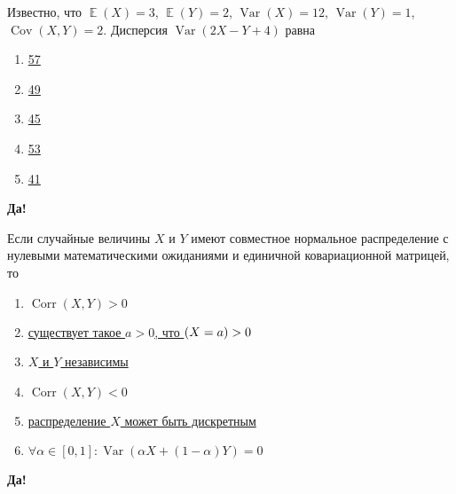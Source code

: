 \documentclass[t]{beamer}
\DeclareMathOperator{\Var}{Var}
\DeclareMathOperator{\Cov}{Cov}
\DeclareMathOperator{\Corr}{Corr}
\DeclareMathOperator{\E}{\mathbb{E}}
\let\P\relax
\DeclareMathOperator{\P}{\mathbb{P}}
\begin{document}
 \begin{frame} \label{13-Yes} 
\begin{block}{13} 

  Известно, что $\E(X)=3$, $\E(Y)=2$, $\Var(X)=12$, $\Var(Y)=1$, $\Cov(X,Y)=2$. Дисперсия $\Var(2X-Y+4)$ равна
  


 \end{block} 
\begin{enumerate} 
\item[] \hyperlink{13-No}{\beamergotobutton{} 57}
\item[] \hyperlink{13-No}{\beamergotobutton{} 49}
\item[] \hyperlink{13-No}{\beamergotobutton{} 45}
\item[] \hyperlink{13-No}{\beamergotobutton{} 53}
\item[] \hyperlink{13-Yes}{\beamergotobutton{} 41}
\end{enumerate} 

 \textbf{Да!} 
 \hyperlink{14}{}\end{frame} 


 \begin{frame} \label{14-Yes} 
\begin{block}{14} 

  Если случайные величины $X$ и $Y$ имеют совместное нормальное распределение с нулевыми математическими ожиданиями и единичной ковариационной матрицей, то
  


 \end{block} 
\begin{enumerate} 
\item[] \hyperlink{14-No}{\beamergotobutton{} $\Corr(X,Y)>0$}
\item[] \hyperlink{14-No}{\beamergotobutton{} существует такое $a>0$, что $\P(X=a)>0$}
\item[] \hyperlink{14-Yes}{\beamergotobutton{} $X$ и $Y$ независимы}
\item[] \hyperlink{14-No}{\beamergotobutton{} $\Corr(X,Y)<0$}
\item[] \hyperlink{14-No}{\beamergotobutton{} распределение $X$ может быть дискретным}
\item[] \hyperlink{14-No}{\beamergotobutton{} $\forall \alpha \in [0,1]: \Var(\alpha X + (1-\alpha)Y) = 0$}
\end{enumerate} 

 \textbf{Да!} 
 \hyperlink{15}{}\end{frame} 
\end{document}
